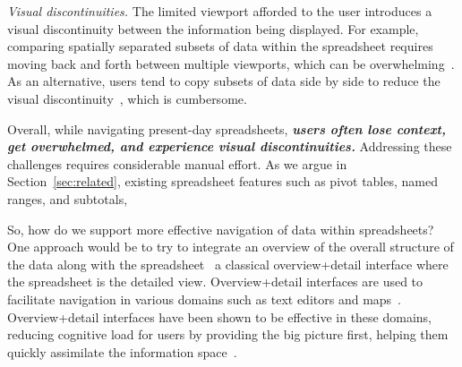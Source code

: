 \item {\em Visual discontinuities.}
The limited viewport afforded to the user
introduces a visual discontinuity between the
information being displayed.
For example, comparing spatially separated subsets
of data within the spreadsheet
requires moving back and forth between multiple viewports,
which can be overwhelming~\cite{nardi1990spreadsheet,network-context}.
As an alternative, users tend to copy subsets of data side by side to
reduce the visual discontinuity~\cite{nardi1990spreadsheet,network-context},
which is cumbersome.
\squishend

\noindent
Overall,  while navigating present-day spreadsheets, 
{\bf \em users often lose context,
get overwhelmed, and experience visual discontinuities.} 
Addressing these challenges requires considerable manual effort.
As we  argue in Section~\ref{sec:related},
existing spreadsheet features such as
pivot tables, named ranges, and subtotals,


So, how do we support more effective navigation of data
within spreadsheets?
One approach would be to try to integrate
an overview of the overall structure of the data along
with the spreadsheet~\cite{grudin2001partitioning}
 a classical
overview+detail interface
where the spreadsheet is the detailed view.
Overview+detail interfaces are used
to facilitate navigation in various domains such as 
text editors and maps~\cite{cockburn2009review}.
Overview+detail interfaces
have been shown to be effective in these domains,
reducing cognitive load for users by
providing  the big picture first,
helping them quickly assimilate 
the information space~\cite{cockburn2009review}.

